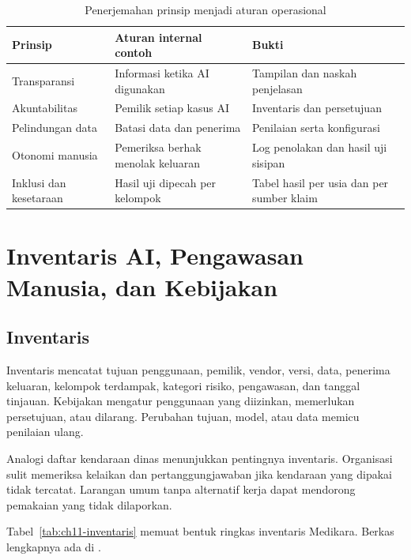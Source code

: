 \begin{table}[!htb]
  \centering\small
  \caption{Penerjemahan prinsip menjadi aturan operasional}\label{tab:ch11-indonesia}
  \begin{tabularx}{\textwidth}{|>{\raggedright\arraybackslash}X|>{\raggedright\arraybackslash}X|>{\raggedright\arraybackslash}X|}
    \hline
    \textbf{Prinsip} & \textbf{Aturan internal contoh} & \textbf{Bukti} \\ \hline
    Transparansi & Informasi ketika AI digunakan & Tampilan dan naskah penjelasan \\ \hline
    Akuntabilitas & Pemilik setiap kasus AI & Inventaris dan persetujuan \\ \hline
    Pelindungan data & Batasi data dan penerima & Penilaian serta konfigurasi \\ \hline
    Otonomi manusia & Pemeriksa berhak menolak keluaran & Log penolakan dan hasil uji sisipan \\
    \hline
    Inklusi dan kesetaraan & Hasil uji dipecah per kelompok & Tabel hasil per usia dan per sumber
    klaim \\ \hline
  \end{tabularx}
\end{table}

\section{Inventaris AI, Pengawasan Manusia, dan Kebijakan}

\subsection*{Inventaris}

Inventaris mencatat tujuan penggunaan, pemilik, vendor, versi, data, penerima keluaran, kelompok
terdampak, kategori risiko, pengawasan, dan tanggal tinjauan. Kebijakan mengatur penggunaan yang
diizinkan, memerlukan persetujuan, atau dilarang. Perubahan tujuan, model, atau data memicu
penilaian ulang.

Analogi daftar kendaraan dinas menunjukkan pentingnya inventaris. Organisasi sulit memeriksa
kelaikan dan pertanggungjawaban jika kendaraan yang dipakai tidak tercatat. Larangan umum tanpa
alternatif kerja dapat mendorong pemakaian yang tidak dilaporkan.

Tabel~\ref{tab:ch11-inventaris} memuat bentuk ringkas inventaris Medikara. Berkas lengkapnya ada di
.

